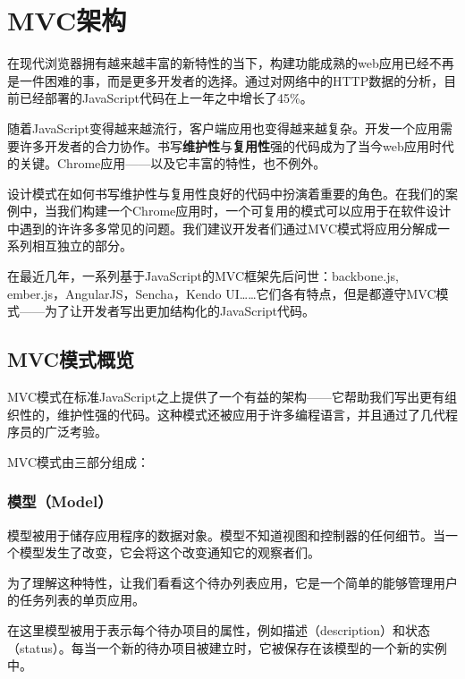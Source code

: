 
\chapter{MVC架构}
在现代浏览器拥有越来越丰富的新特性的当下，构建功能成熟的web应用已经不再是一件困难的事，而是更多开发者的选择。通过对网络中的HTTP数据的分析，目前已经部署的JavaScript代码在上一年之中增长了45\%。


随着JavaScript变得越来越流行，客户端应用也变得越来越复杂。开发一个应用需要许多开发者的合力协作。书写\textbf{维护性}与\textbf{复用性}强的代码成为了当今web应用时代的关键。Chrome应用——以及它丰富的特性，也不例外。

设计模式在如何书写维护性与复用性良好的代码中扮演着重要的角色。在我们的案例中，当我们构建一个Chrome应用时，一个可复用的模式可以应用于在软件设计中遇到的许许多多常见的问题。我们建议开发者们通过MVC模式将应用分解成一系列相互独立的部分。

在最近几年，一系列基于JavaScript的MVC框架先后问世：backbone.js, ember.js，AngularJS，Sencha，Kendo UI……它们各有特点，但是都遵守MVC模式——为了让开发者写出更加结构化的JavaScript代码。


\section{MVC模式概览}
MVC模式在标准JavaScript之上提供了一个有益的架构——它帮助我们写出更有组织性的，维护性强的代码。这种模式还被应用于许多编程语言，并且通过了几代程序员的广泛考验。

MVC模式由三部分组成：



\subsection{模型（Model）}
模型被用于储存应用程序的数据对象。模型不知道视图和控制器的任何细节。当一个模型发生了改变，它会将这个改变通知它的观察者们。

为了理解这种特性，让我们看看这个待办列表应用，它是一个简单的能够管理用户的任务列表的单页应用。


在这里模型被用于表示每个待办项目的属性，例如描述（description）和状态（status）。每当一个新的待办项目被建立时，它被保存在该模型的一个新的实例中。


